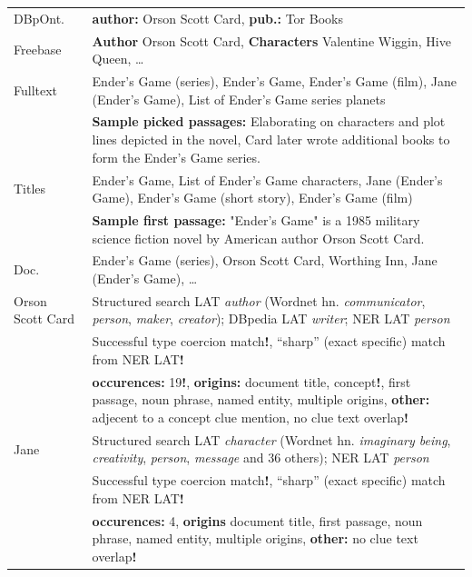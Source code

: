 \documentclass[xcolor=table]{beamer}
\begin{document}
\begin{frame}[fragile]{}
\begin{columns}[t]
\begin{columns}[t]
\begin{tabular}{|p{3.6cm}p{13cm}|}
DBpOnt. & \textbf{author:} Orson Scott Card, \textbf{pub.:} Tor Books\\
Freebase & \textbf{Author} Orson Scott Card, \textbf{Characters} Valentine Wiggin, Hive Queen, \dots \\
Fulltext %
	& Ender's Game (series), Ender's Game, Ender's Game (film), Jane (Ender's Game), List of Ender's Game series planets \\
	& \textbf{Sample picked passages:} {\footnotesize Elaborating on characters and plot lines depicted in the novel, Card later wrote additional books to form the Ender's Game series.} \\
Titles & Ender's Game, List of Ender's Game characters, Jane (Ender's Game), Ender's Game (short story), Ender's Game (film) \\
	& \textbf{Sample first passage:} {\footnotesize "Ender's Game" is a 1985 military science fiction novel by American author Orson Scott Card.} \\
Doc. & Ender's Game (series), Orson Scott Card, Worthing Inn, Jane (Ender's Game), \dots \\ \hline

\hspace{0pt}\alert{Orson Scott Card} & Structured search LAT \textit{author} (Wordnet hn. \textit{communicator}, \textit{person}, \textit{maker}, \textit{creator}); DBpedia LAT \textit{writer}; NER LAT \textit{person} \\
	& Successful type coercion match\textbf{!}, ``sharp'' (exact specific) match from NER LAT\textbf{!} \\
	& \textbf{occurences:} 19\textbf{!}, \textbf{origins:} document title, concept\textbf{!}, first passage, noun phrase, named entity, multiple origins, \textbf{other:} adjecent to a concept clue mention, no clue text overlap\textbf{!} \\
\hspace{0pt}\alert{Jane} & Structured search LAT \textit{character} (Wordnet hn. \textit{imaginary being}, \textit{creativity}, \textit{person}, \textit{message} and 36 others); NER LAT \textit{person} \\
	& Successful type coercion match\textbf{!}, ``sharp'' (exact specific) match from NER LAT\textbf{!} \\
	& \textbf{occurences:} 4, \textbf{origins} document title, first passage, noun phrase, named entity, multiple origins,
	\textbf{other:} no clue text overlap\textbf{!} \\ \hline


\end{tabular}
\end{columns}
\end{columns}
\end{frame}
\end{document}

